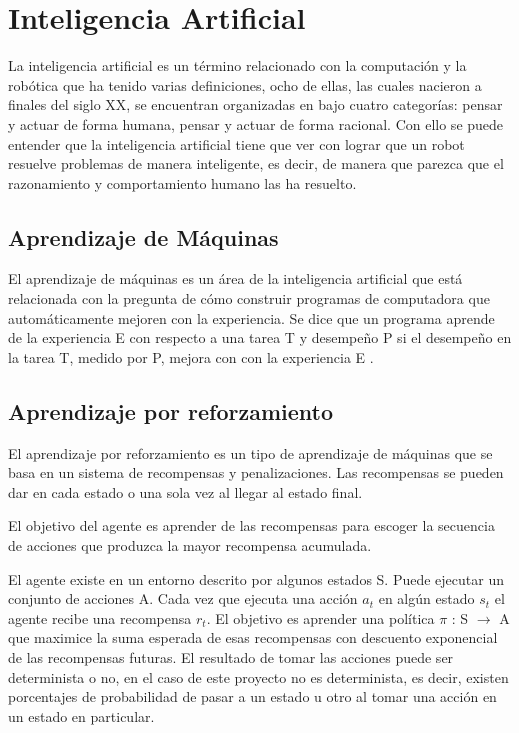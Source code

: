 \section{Inteligencia Artificial} \label{sect:Inteligencia_Artificial}
La inteligencia artificial es un término relacionado con la computación y la robótica que ha tenido varias definiciones, ocho de ellas, las cuales nacieron a finales del siglo XX, se encuentran organizadas en \cite{peterNorvig} bajo cuatro categorías: pensar y actuar de forma humana, pensar y actuar de forma racional. Con ello se puede entender que la inteligencia artificial tiene que ver con lograr que un robot resuelve problemas de manera inteligente, es decir, de manera que parezca que el razonamiento y comportamiento humano las ha resuelto.  

\subsection{ Aprendizaje de Máquinas}
El aprendizaje de máquinas es un área de la inteligencia artificial que está relacionada con la pregunta de cómo construir programas de computadora que automáticamente mejoren con la experiencia. Se dice que un programa aprende de la experiencia E con respecto a una tarea T y desempeño P si el desempeño en la tarea T, medido por P, mejora con con la experiencia E \cite{Mitchell}.
\subsection{Aprendizaje por reforzamiento}
El aprendizaje por reforzamiento es un tipo de aprendizaje de máquinas que se basa en un sistema de recompensas y penalizaciones. Las recompensas se pueden dar en cada estado o una sola vez al llegar al estado final.

El objetivo del agente es aprender de las recompensas para escoger la secuencia de acciones que produzca la mayor recompensa acumulada. \cite{Mitchell}

El agente existe en un entorno descrito por algunos estados S. Puede ejecutar un conjunto de acciones A. Cada vez que ejecuta una acción $a_t$ en algún estado $s_t$ el agente recibe una recompensa $r_t$. El objetivo es aprender una política $\pi$ : S $\to$ A que maximice la suma esperada de esas recompensas con descuento exponencial de las recompensas futuras. \cite{Mitchell} El resultado de tomar las acciones puede ser determinista o no, en el caso de este proyecto no es determinista, es decir, existen porcentajes de probabilidad de pasar a un estado u otro al tomar una acción en un estado en particular.  
